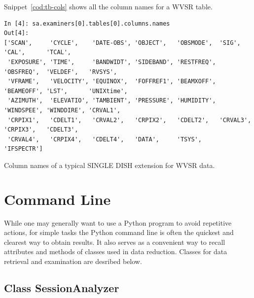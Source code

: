 \documentclass[letterpaper,11pt]{book}
\begin{document}
Snippet~\ref{cod:tb-cols} shows all the column names for a WVSR table.
\begin{code}[h!tb]
\begin{center}
{\scriptsize \begin{verbatim}
In [4]: sa.examiners[0].tables[0].columns.names
Out[4]: 
['SCAN',     'CYCLE',    'DATE-OBS', 'OBJECT',   'OBSMODE',  'SIG',      'CAL',      'TCAL',
 'EXPOSURE', 'TIME',     'BANDWIDT', 'SIDEBAND', 'RESTFREQ', 'OBSFREQ',  'VELDEF',   'RVSYS',
 'VFRAME',   'VELOCITY', 'EQUINOX',  'FOFFREF1', 'BEAMXOFF', 'BEAMEOFF', 'LST',      'UNIXtime',
 'AZIMUTH',  'ELEVATIO', 'TAMBIENT', 'PRESSURE', 'HUMIDITY', 'WINDSPEE', 'WINDDIRE', 'CRVAL1',
 'CRPIX1',   'CDELT1',   'CRVAL2',   'CRPIX2',   'CDELT2',   'CRVAL3',   'CRPIX3',   'CDELT3',
 'CRVAL4',   'CRPIX4',   'CDELT4',   'DATA',     'TSYS',     'IFSPECTR']
\end{verbatim}
}\caption{\label{cod:tb-cols}Column names of a typical SINGLE DISH extension for
WVSR data.}
\end{center}
\end{code}

\chapter{Command Line}\label{chap:cmd-line}

While one may generally want to use a Python program to avoid repetitive actions,
for simple tasks the Python command line is often the quickest and clearest way
to obtain results.  It also serves as a convenient way to recall attributes
and methods of classes used in data reduction. Classes for data retrieval and
examination are desribed below.

\section{Class {\ttfamily SessionAnalyzer}}
\end{document}
